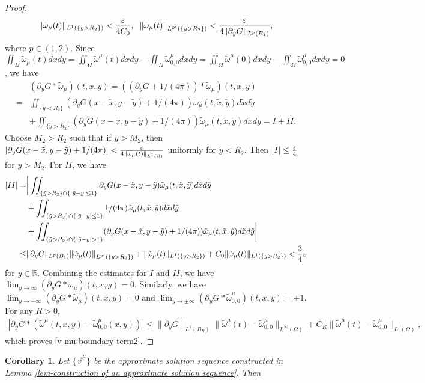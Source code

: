 \documentclass[1 [leqno, 11pt]{amsart}
\numberwithin{equation}{section}
\newtheorem{Corollary}[Theorem]{Corollary}
\begin{document}
\begin{CJK*}{GBK}{song}
\begin{appendix}
\begin{proof}
\begin{align*}
\|\tilde \omega_\mu(t)\|_{L^1(\{y>R_2\})}<{\varepsilon\over 4C_0},\;\;\|\tilde \omega_\mu(t)\|_{L^{p'}(\{y>R_2\})}<{\varepsilon\over 4\|\partial_yG\|_{L^p(B_1)}},
\end{align*}
where $p\in(1,2)$.
Since
$\iint_\Omega\tilde \omega_\mu(t)dxdy=\iint_\Omega\tilde \omega^\mu(t)dxdy-\iint_\Omega\tilde \omega_{0,0}^\mu dxdy=\iint_\Omega\tilde \omega^\mu(0)dxdy-\iint_\Omega\tilde \omega_{0,0}^\mu dxdy=0$, we have
\begin{align*}
&(\partial_y G\ast\tilde \omega_\mu)(t,x,y)=((\partial_y G+{1/ (4\pi)})\ast\tilde \omega_\mu)(t,x,y)\\
=&\iint_{\{\tilde y<R_2\}}(\partial_y G(x-\tilde x,y-\tilde y)+{1/ (4\pi)})\tilde \omega_\mu(t,\tilde x,\tilde y)d\tilde x d\tilde y\\
&+\iint_{\{\tilde y>R_2\}}(\partial_y G(x-\tilde x,y-\tilde y)+{1/ (4\pi)})\tilde \omega_\mu(t,\tilde x,\tilde y)d\tilde x d\tilde y= I +II.
\end{align*}
Choose $M_2>R_2$ such that if $y>M_2$, then $|\partial_y G(x-\tilde x,y-\tilde y)+{1/(4\pi)}|<{\varepsilon\over 4\|\tilde \omega_\mu(t)\|_{L^1(\Omega)}}$ uniformly for $\tilde y<R_2$. Then
$
|I|\leq {\varepsilon\over4}
$
for $y>M_2$. For $II$, we have
\begin{align*}
|II|=&\bigg|\iint_{\{\tilde y>R_2\}\cap\{|\tilde y-y|\leq1\}}\partial_y G(x-\tilde x,y-\tilde y)\tilde \omega_\mu(t,\tilde x,\tilde y)d\tilde x d\tilde y\\
&+\iint_{\{\tilde y>R_2\}\cap\{|\tilde y-y|\leq1\}}{1/ (4\pi)}\tilde \omega_\mu(t,\tilde x,\tilde y)d\tilde x d\tilde y\\
&+\iint_{\{\tilde y>R_2\}\cap\{|\tilde y-y|>1\}}(\partial_y G(x-\tilde x,y-\tilde y)+{1/ (4\pi)})\tilde \omega_\mu(t,\tilde x,\tilde y)d\tilde x d\tilde y\bigg|\\
\leq &\|\partial_yG\|_{L^p(B_1)}\|\tilde \omega_\mu(t)\|_{L^{p'}(\{y>R_2\})}+\|\tilde \omega_\mu(t)\|_{L^1(\{y>R_2\})}+C_0\|\tilde \omega_\mu(t)\|_{L^1(\{y>R_2\})}<{3\over4}\varepsilon
\end{align*}
for $y\in\mathbb{R}$. Combining the estimates for $I$ and $II$, we have $\lim_{y\to\infty}(\partial_y G\ast\tilde \omega_\mu)(t,x,y)=0$.
Similarly, we have $\lim_{y\to-\infty}(\partial_y G\ast\tilde \omega_\mu)(t,x,y)=0$ and $\lim_{y\to\pm\infty}(\partial_y G\ast\tilde \omega_{0,0}^\mu)(t,x,y)=\pm1$.
 For any $R>0$,
 \begin{align*}
|\partial_y G\ast(\tilde \omega^\mu(t,x,y)-\tilde\omega_{0,0}^{\mu}(x,y))|\leq\|\partial_y G\|_{L^1(B_R)}\|\tilde \omega^\mu(t)-\tilde\omega_{0,0}^{\mu}\|_{L^\infty(\Omega)}+C_R\|\tilde \omega^\mu(t)-\tilde\omega_{0,0}^{\mu}\|_{L^1(\Omega)},
\end{align*}
which proves \eqref{v-mu-boundary term2}.
\fi
\end{proof}
\begin{Corollary}\label{y-tilde-omega-pseudoenergy-conserved}
Let $\{\vec{v}^\mu\}$ be the approximate solution sequence constructed in Lemma \ref{lem-construction of an approximate solution sequence}.
Then


\end{Corollary}
\end{appendix}
\end{CJK*}
\end{document}
